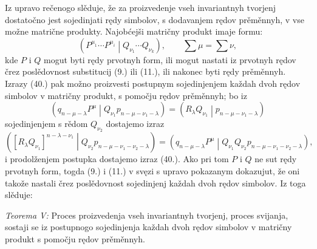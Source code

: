 \documentclass[11pt]{article}
\newcommand{\pair}[2]{\left(#1\middle|#2\right)}
\begin{document}
Iz upravo rečenogo slěduje, že za proizvedenje vseh invariantnyh tvorjenj dostatočno jest sojedinjati rędy simbolov, s dodavanjem rędov prěměnnyh, v vse možne matrične produkty. Najobćejši matričny produkt imaje formu:
\begin{equation}
 \pair{P^{\mu_1}\cdots P^{\mu_i}}{Q_{\nu_1}\cdots Q_{\nu_k}},
 \qquad \sum\mu=\sum\nu,
\tag{40}
\end{equation}
kde $P$ i $Q$ mogut byti rędy prvotnyh form, ili mogut nastati iz prvotnyh rędov črez poslědovnost substitucij (9.) ili (11.), ili nakonec byti rędy prěměnnyh. Izrazy (40.) pak možno proizvesti postupnym sojedinjenjem každah dvoh rędov simbolov v matričny produkt, s pomočju rędov prěměnnyh; bo iz
\[
 \pair{q_{n-\mu-\lambda}P^\mu}{Q_{\nu_1}p_{n-\mu-\nu_1-\lambda}}
 =\pair{R_\lambda Q_{\nu_1}}{p_{n-\mu-\nu_1-\lambda}}
\]
sojedinjenjem s rědom $Q_{\nu_2}$ dostajemo izraz
\[
 \pair{[R_\lambda Q_{\nu_1}]^{n-\lambda-\nu_1}}
 {Q_{\nu_2}p_{n-\mu-\nu_1-\nu_2-\lambda}}
 =\pair{q_{n-\mu-\lambda}P^\mu}
 {Q_{\nu_1}Q_{\nu_2}p_{n-\mu-\nu_1-\nu_2-\lambda}},
\]
i prodolženjem postupka dostajemo izraz (40.). Ako pri tom $P$ i $Q$ ne sut rędy prvotnyh form, togda (9.) i (11.) v svęzi s upravo pokazanym dokazujut, že oni takože nastali črez poslědovnost sojedinjenj každah dvoh rędov simbolov. Iz toga slěduje:

\emph{Teorema V:} Proces proizvedenja vseh invariantnyh tvorjenj, proces svijanja, sostaji se iz postupnogo sojedinjenja každah dvoh rędov simbolov v matričny produkt s pomočju rędov prěměnnyh.
\end{document}
